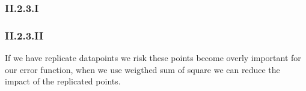\documentclass{article}
\begin{document}
\subsubsection{II.2.3.I}

\subsubsection{II.2.3.II}
If we have replicate datapoints we risk these points become overly important
for our error function, when we use weigthed sum of square we can reduce the impact
of the replicated points. 
\end{document}
